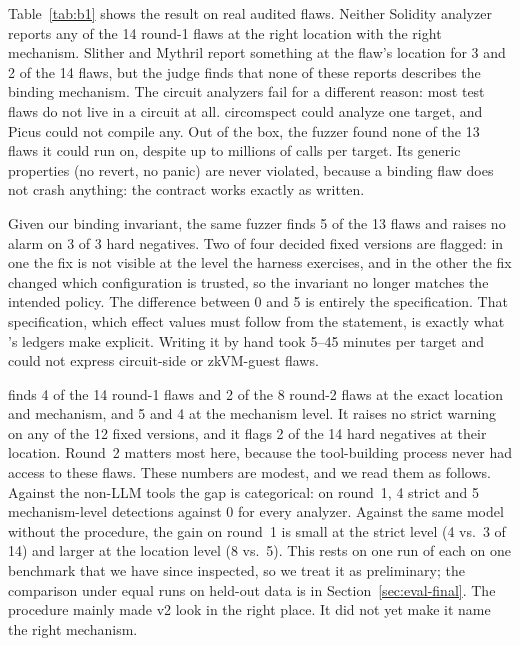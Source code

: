 Table~\ref{tab:b1} shows the result on real audited flaws. Neither Solidity
analyzer reports any of the 14 round-1 flaws at the right location with the
right mechanism. Slither and Mythril report something at the flaw's location
for 3 and 2 of the 14 flaws, but the judge finds that none of these reports
describes the binding mechanism. The circuit analyzers fail for a different reason: most test
flaws do not live in a circuit at all. circomspect could analyze one target,
and Picus could not compile any. Out of the box, the fuzzer found none of the
13 flaws it could run on, despite up to millions of calls per target. Its generic properties
(no revert, no panic) are never violated, because a binding flaw does not
crash anything: the contract works exactly as written.

Given our binding invariant, the same fuzzer finds 5 of the 13 flaws and raises no alarm on 3 of 3 hard negatives. Two of four
decided fixed versions are flagged: in one the fix is not visible at the
level the harness exercises, and in the other the fix changed which configuration is
trusted, so the invariant no longer matches the intended policy. The
difference between 0 and 5 is entirely the specification. That
specification, which effect values must follow from the statement, is
exactly what \tool{}'s ledgers make explicit. Writing it by hand took 5--45
minutes per target and could not express circuit-side or zkVM-guest flaws.

\tool{} finds 4 of the 14 round-1 flaws and 2 of the 8 round-2 flaws at the
exact location and mechanism, and 5 and 4 at the mechanism level. It raises no
strict warning on any of the 12 fixed versions, and it flags 2 of the 14 hard
negatives at their location. Round~2 matters most here, because the
tool-building process never had access to these flaws. These numbers are
modest, and we read them as follows. Against the non-LLM tools the gap is
categorical: on round~1, 4 strict and 5 mechanism-level detections against 0
for every analyzer. Against the same model without the procedure, the gain
on round~1 is small at the strict level (4 vs.\ 3 of 14) and larger at the
location level (8 vs.\ 5). This rests on one run of each on one benchmark
that we have since inspected, so we treat it as preliminary; the comparison
under equal runs on held-out data is in Section~\ref{sec:eval-final}. The
procedure mainly made v2 look in the right place. It did not yet make it name
the right mechanism.

